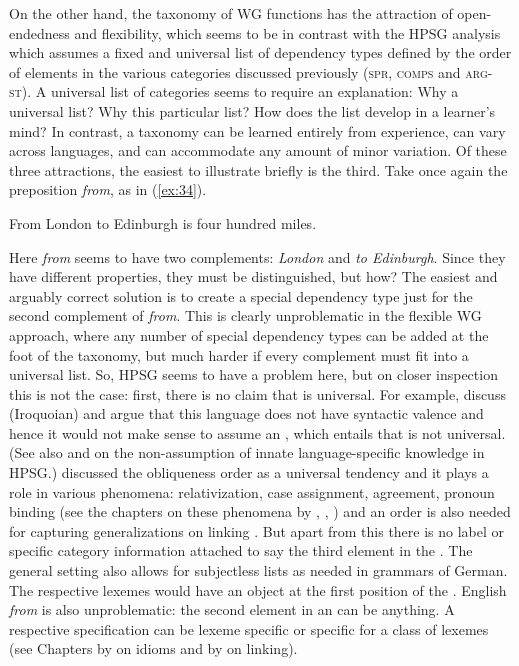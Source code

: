 \documentclass[output=paper,biblatex,babelshorthands,newtxmath,draftmode,colorlinks,citecolor=brown]{langscibook}
\begin{document}
On the other hand, the taxonomy of WG functions has the attraction of open-endedness and
flexibility, which seems to be in contrast with the HPSG analysis which assumes a fixed and universal list of
dependency types defined by the order of elements in the various categories discussed previously
(\textsc{spr}, \textsc{comps} and \textsc{arg-st}). A universal list of categories seems to require an
explanation: Why a universal list? Why this particular list? How does the list develop in a
learner's mind? In contrast, a taxonomy can be learned entirely from experience, can vary across
languages, and can accommodate any amount of minor variation. Of these three attractions, the
easiest to illustrate briefly is the third. Take once again the  preposition
\emph{from}, as in (\ref{ex:34}).
%
\begin{exe}
\ex \label{ex:34} From London to Edinburgh is four hundred miles.
\end{exe}
%
\noindent
Here \emph{from} seems to have two complements: \emph{London} and \emph{to Edinburgh}. Since they
have different properties, they must be distinguished, but how? The easiest and arguably correct
solution is to create a special dependency type just for the second complement of \emph{from}. This
is clearly unproblematic in the flexible WG approach, where any number of special dependency types
can be added at the foot of the taxonomy, but much harder if every complement must fit into a
universal list. So, HPSG seems to have a problem here, but on closer inspection this is not the
case: first, there is no claim that \argst is universal. For example, \citet{KM15a-u} discuss 
(Iroquoian) and argue that this language does not have syntactic valence and hence it would not make
sense to assume an \argstl, which entails that \argst is not universal. (See also
 and
 on the non-assumption
of innate language-specific knowledge in HPSG.) \citet{KC77a} discussed
the obliqueness order as a universal tendency and it plays a role in various phenomena:
relativization, case assignment, agreement, pronoun binding (see the chapters on these phenomena by
\citealt{chapters/case}, \citealt{chapters/agreement}, \citealt{chapters/binding}) and an order is also
needed for capturing generalizations on linking \citep*{chapters/arg-st}. But apart from this there
is no label or specific category information attached to say the third element in the
\argstl. The general setting also allows for subjectless \argst lists as needed in grammars of
German. The respective lexemes would have an object at the first position of the \argstl.
English \emph{from} is also unproblematic: the second element in an \argstl can be
anything. A respective specification can be lexeme specific or specific for a class of lexemes (see
Chapters by \citet*{chapters/idioms} on idioms and by \citet*{chapters/arg-st} on linking).
\end{document}
